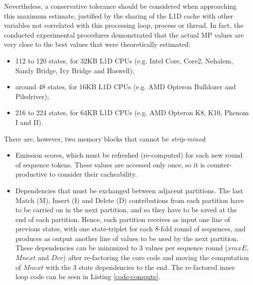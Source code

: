 \documentclass{bmcart}
\newcommand{\cref}[1]{Listing \ref{#1}}
\begin{document}
Nevertheless, a conservative tolerance should be considered when approaching this maximum estimate, justified by the sharing of the \ac{L1D} cache with other variables not correlated with this processing loop, process or thread. In fact, the conducted experimental procedures demonstrated that the actual  \ac{MP} values are very close to the best values that were theoretically estimated:
\begin{itemize}[noitemsep,nolistsep]
\item 112 to 120 states, for 32KB L1D CPUs (e.g. Intel Core, Core2, Nehalem, Sandy Bridge, Ivy Bridge and Haswell);
\item around 48  states, for 16KB L1D CPUs (e.g. AMD Opteron Bulldozer and Piledriver);
\item 216 to 224 states, for 64KB L1D CPUs (e.g. AMD Opteron K8, K10, Phenom I and II).
\end{itemize}

There are, however, two memory blocks that cannot be \emph{strip-mined}:
\begin {itemize}
\item Emission scores, which must be refreshed (re-computed) for each new round of sequence tokens. These values are accessed only once, so it is counter-productive to consider their cacheability.
\item Dependencies that must be exchanged between adjacent partitions. The last Match (M), Insert (I) and Delete (D) contributions from each partition have to be carried on in the next partition, and so they have to be saved at the end of each partition. Hence, each partition receives as input one line of previous states, with one state-triplet for each 8-fold round of sequences, and produces as output another line of values to be used by the next partition. These dependencies can be minimized to 3 values per sequence round ($xmxE$, $Mnext$ and $Dcv$) after re-factoring the core code and moving the computation of $Mnext$ with the 3 state dependencies to the end. The re-factored inner loop code can be seen in \cref{code-compute}.
\end {itemize}




\end{document}
